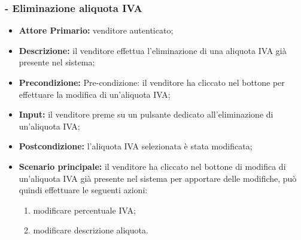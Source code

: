 \stepsubUserCase
\subsubsection{- Eliminazione aliquota IVA}
\begin{itemize}
    \item \textbf{Attore Primario:} venditore autenticato;
    \item \textbf{Descrizione:} il venditore effettua l'eliminazione di una aliquota IVA già presente nel sistema;
    \item \textbf{Precondizione:} Pre-condizione: il venditore ha cliccato nel bottone per effettuare la modifica di un’aliquota IVA;
    \item \textbf{Input:} il venditore preme su un pulsante dedicato all'eliminazione di un'aliquota IVA;
    \item \textbf{Postcondizione:} l'aliquota IVA selezionata è stata modificata;
    \item \textbf{Scenario principale:} il venditore ha cliccato nel bottone di modifica di un’aliquota IVA già presente nel sistema per apportare delle modifiche, può quindi effettuare le seguenti azioni:
    \begin{enumerate}
        \item modificare percentuale IVA;
        \item modificare descrizione aliquota.
    \end{enumerate}
\end{itemize}

\stepUserCase
